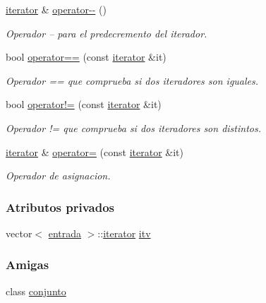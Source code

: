\begin{DoxyCompactItemize}
\hyperlink{classconjunto_1_1iterator}{iterator} \& \hyperlink{classconjunto_1_1iterator_a8a1050331902395fa3f13211ee23c4e1}{operator-\/-\/} ()
\begin{DoxyCompactList}\small\item\em Operador -- para el predecremento del iterador. \end{DoxyCompactList}\item 
bool \hyperlink{classconjunto_1_1iterator_a771856bc966ec46b19f4756592cb084c}{operator==} (const \hyperlink{classconjunto_1_1iterator}{iterator} \&it)
\begin{DoxyCompactList}\small\item\em Operador == que comprueba si dos iteradores son iguales. \end{DoxyCompactList}\item 
bool \hyperlink{classconjunto_1_1iterator_a50fefbd7759c9faedbcd814050dc7191}{operator!=} (const \hyperlink{classconjunto_1_1iterator}{iterator} \&it)
\begin{DoxyCompactList}\small\item\em Operador != que comprueba si dos iteradores son distintos. \end{DoxyCompactList}\item 
\hyperlink{classconjunto_1_1iterator}{iterator} \& \hyperlink{classconjunto_1_1iterator_aa6960876f79bd860e303c634ce787481}{operator=} (const \hyperlink{classconjunto_1_1iterator}{iterator} \&it)
\begin{DoxyCompactList}\small\item\em Operador de asignacion. \end{DoxyCompactList}\end{DoxyCompactItemize}
\subsubsection*{Atributos privados}
\begin{DoxyCompactItemize}
\item 
vector$<$ \hyperlink{classconjunto_a09cad766dd65de73e51eae21f9d22585}{entrada} $>$\-::\hyperlink{classconjunto_1_1iterator}{iterator} \hyperlink{classconjunto_1_1iterator_a5bd607fdec49c2ab132859bf922e2db6}{itv}
\end{DoxyCompactItemize}
\subsubsection*{Amigas}
\begin{DoxyCompactItemize}
\item 
class \hyperlink{classconjunto_1_1iterator_a42fdcda39c77eabd7380e29fcdbe5dd2}{conjunto}
\end{DoxyCompactItemize}


